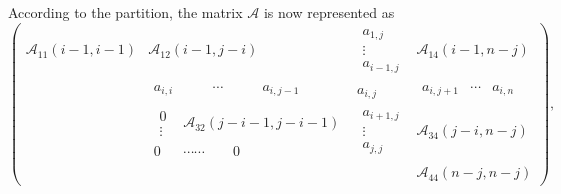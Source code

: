 \documentclass[pdftex]{sigma}
\numberwithin{equation}{section}
\def\A{\mathscr{A}}
\begin{document}
According to the partition, the matrix $\A$ is now represented as
\begin{equation}\label{eqn-A}
 \left(
 \begin{array}{c|c|c|c}
 \A_{11}(i-1,i-1) & \A_{12}(i-1,j-i) &
 \begin{array}{c} a_{1,j}\\ \vdots \\ a_{i-1, j} \end{array}
& \A_{14}(i-1,n-j)\\
 \hline
 \begin{array}{ccc} & & \end{array} &
 \begin{array}{lcl} a_{i,i} \quad & \quad \cdots \quad & \quad a_{i,j-1} \end{array}
 & a_{i, j} &
 \begin{array}{ccc} a_{i, j+1} & \cdots & a_{i, n} \end{array}
 \\
 \hline
 \begin{array}{ccc} & & \\
 & & \\
 & & \end{array} & \begin{array}{cc} \begin{array}{c}
 0\\
 \vdots
 \end{array}&
 \A_{32}(j-i-1,j-i-1)\\ 0&\cdots\cdots \qquad 0\end{array}
 &
 \begin{array}{c} a_{i+1, j}\\ \vdots \\ a_{j, j}\end{array}
 & \A_{34}(j-i,n-j)\\
 \hline
 \begin{array}{ccc} & & \\
 & & \\
 & & \end{array} & \begin{array}{ccc} & & \\
 & & \\
 & & \end{array} & \begin{array}{ccc} & & \\
 & & \\
 & & \end{array} & \A_{44}(n-j,n-j)
 \end{array}
 \right),
\end{equation}
\end{document}
